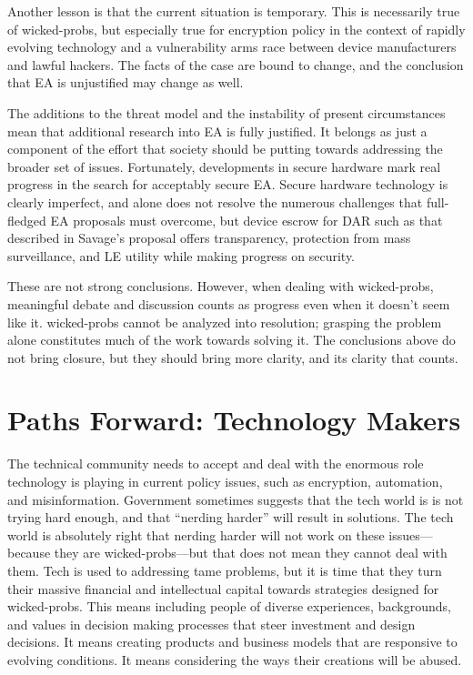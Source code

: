 Another lesson is that the current situation is temporary. This is necessarily true of \acp{wicked-prob}, but especially
true for encryption policy in the context of rapidly evolving technology and a vulnerability arms race between device
manufacturers and lawful hackers. The facts of the case are bound to change, and the conclusion that \ac{EA} is
unjustified may change as well.


The additions to the threat model and the instability of present circumstances mean that additional research into
\ac{EA} is fully justified. It belongs as just a component of the effort that society should be putting towards
addressing the broader set of issues. Fortunately, developments in secure hardware mark real progress in the search for
acceptably secure \ac{EA}. Secure hardware technology is clearly imperfect, and alone does not resolve the numerous
challenges that full-fledged \ac{EA} proposals must overcome, but device escrow for \acl{DAR} such as that described in
Savage's proposal offers transparency, protection from mass surveillance, and \acl{LE} utility while making progress on
security.

These are not strong conclusions. However, when dealing with \acp{wicked-prob}, meaningful debate and discussion counts
as progress even when it doesn't seem like it. \Acp{wicked-prob} cannot be analyzed into resolution; grasping the
problem alone constitutes much of the work towards solving it. The conclusions above do not bring closure, but they
should bring more clarity, and its clarity that counts.


\section{Paths Forward: Technology Makers}

The technical community needs to accept and deal with the enormous role technology is playing in current policy issues,
such as encryption, automation, and misinformation. Government sometimes suggests that the tech world is is not trying
hard enough, and that ``nerding harder'' will result in solutions. The tech world is absolutely right that nerding
harder will not work on these issues---because they are \acp{wicked-prob}---but that does not mean they cannot deal with
them. Tech is used to addressing tame problems, but it is time that they turn their massive financial and intellectual
capital towards strategies designed for \acp{wicked-prob}. This means including people of diverse experiences,
backgrounds, and values in decision making processes that steer investment and design decisions. It means creating
products and business models that are responsive to evolving conditions. It means considering the ways their creations
will be abused.

